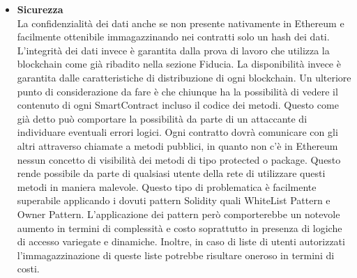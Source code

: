 \begin{itemize}
    Lo studio Gartner\footcite{farah:The-Dawn-of-Decentralized-Identity} evidenzia come in una rete permissionless la tracciabilità temporale non sia possibile, in quanto in una rete distribuita ogni nodo può avere un concetto di tempo proprio. Questo però non risulta possibile in nessun approccia risolutivo all’ITF basato su blockchain. Infatti le reti permissioned applicano timestamp a livello di blocco e non di transazione, anche ammettendo che ci sia un concetto di tempo comune tra i nodi, le transizioni rimarrebbero temporalmente non tracciabili. La cosa potrebbe permettere ad un blocco di alterare l’ordine delle transazioni. 
    Questo problema in una rete permissioned può essere risolto creando blocchi immutabili e ogni volta si voglia fare una modifica si dovrà creare un nuovo blocco. In questo modo ci sarà solo una transazione di creazione blocco il cui timestamp coinciderà con il timestamp del blocco.
    Questo approccio in Ethereum rimane comunque impraticabile. Attualmente non sono note ulteriori tecniche per la tracciabilità temporale in Ethereum. Per questa ragione l’attribuzione di un riferimento temporale dovrà essere effettuato lato client, con i conseguenti limiti di sicurezza. 
    \item \textbf{Sicurezza}\\
    La confidenzialità dei dati anche se non presente nativamente in Ethereum e facilmente ottenibile immagazzinando nei contratti solo un hash dei dati.
    L’integrità dei dati invece è garantita dalla prova di lavoro che utilizza la blockchain come già ribadito nella sezione Fiducia.
    La disponibilità invece è garantita dalle caratteristiche di distribuzione di ogni blockchain.
    Un ulteriore punto di considerazione da fare è che chiunque ha la possibilità di vedere il contenuto di ogni SmartContract incluso il codice dei metodi. Questo come già detto può comportare la possibilità da parte di un attaccante di individuare eventuali errori logici. Ogni contratto dovrà comunicare con gli altri attraverso chiamate a metodi pubblici, in quanto non c’è in Ethereum nessun concetto di visibilità dei metodi di tipo protected o package. Questo rende possibile da parte di qualsiasi utente della rete di utilizzare questi metodi in maniera malevole. Questo tipo di problematica è facilmente superabile applicando i dovuti pattern Solidity quali WhiteList Pattern e Owner Pattern. L’applicazione dei pattern però comporterebbe un notevole aumento in termini di complessità e costo soprattutto in presenza di logiche di accesso variegate e dinamiche. Inoltre, in caso di liste di utenti autorizzati l'immagazzinazione di queste liste potrebbe risultare oneroso in termini di costi.

\end{itemize}
